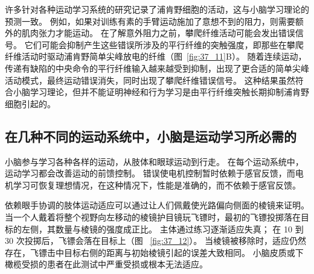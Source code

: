 许多针对各种运动学习系统的研究记录了浦肯野细胞的活动，这与小脑学习理论的预测一致。
例如，如果对训练有素的手臂运动施加了意想不到的阻力，则需要额外的肌肉张力才能运动。
在了解意外阻力之前，攀爬纤维活动可能会发出错误信号。
它们可能会抑制产生这些错误所涉及的平行纤维的突触强度，即那些在攀爬纤维活动时驱动浦肯野简单尖峰放电的纤维（图~\ref{fig:37_11}B）。
随着连续运动，传递有缺陷的中央命令的平行纤维输入越来越受到抑制，出现了更合适的简单尖峰活动模式，最终运动错误消失，同时出现了攀爬纤维错误信号。
这种结果虽然符合小脑学习理论，但并不能证明神经和行为学习是由平行纤维突触长期抑制浦肯野细胞引起的。



\subsection{在几种不同的运动系统中，小脑是运动学习所必需的}

小脑参与学习各种各样的运动，从肢体和眼球运动到行走。
在每个运动系统中，运动学习都会改善运动的前馈控制。
错误使电机控制暂时依赖于感官反馈，而电机学习可恢复理想情况，在这种情况下，性能是准确的，而不依赖于感官反馈。


依赖眼手协调的肢体运动适应可以通过让人们佩戴使光路偏向侧面的棱镜来证明。
当一个人戴着将整个视野向左移动的棱镜护目镜玩飞镖时，最初的飞镖投掷落在目标的左侧，其数量与棱镜的强度成正比。
主体通过练习逐渐适应失真；
在 10 到 30 次投掷后，飞镖会落在目标上（图 ~\ref{fig:37_12}）。
当棱镜被移除时，适应仍然存在，飞镖击中目标右侧的距离与初始棱镜引起的误差大致相同。
小脑皮质或下橄榄受损的患者在此测试中严重受损或根本无法适应。


